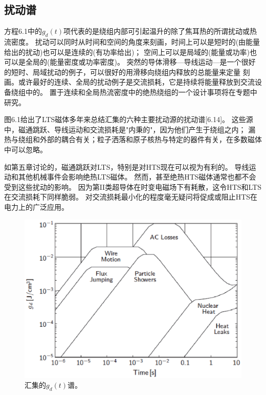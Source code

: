 \subsection{扰动谱}
方程6.1中的$g_d(t)$项代表的是绕组内部可引起温升的除了焦耳热的所谓扰动或热流密度。
扰动可以同时从时间和空间的角度来刻画，时间上可以是短时的(由能量给出的扰动)也可以是连续的(有功率给出)；
空间上可以是局域的(能量或功率)也可以是全局的(能量密度或功率密度)。
突然的导体滑移---导线运动---是一个很好的短时、局域扰动的例子，可以很好的用滑移向绕组内释放的总能量来定量
刻画。或许最好的连续、全局的扰动例子是交流损耗，它是持续将能量释放到交流设备绕组中的。
置于连续和全局热流密度中的绝热绕组的一个设计事项将在专题中研究。

图6.1给出了LTS磁体多年来总结汇集的六种主要扰动源的扰动谱[6.14]。
这些源中，磁通跳跃、导线运动和交流损耗是"内秉的"，因为他们产生于绕组之内；
漏热与绕组和外部的耦合有关；粒子洒落和原子核热与特定的器件有关，在多数磁体中可以忽略。

如第五章讨论的，磁通跳跃对LTS，特别是对HTS现在可以视为有利的。
导线运动和其他机械事件会影响绝热LTS磁体。
然而，甚至绝热HTS磁体通常也都不会受到这些扰动的影响。
因为第II类超导体在时变电磁场下有耗散，这令HTS和LTS在交流损耗下同样脆弱。
对交流损耗最小化的程度毫无疑问将促成或阻止HTS在电力上的广泛应用。

\begin{figure}[htbp]
	\centering
	\includegraphics[scale=0.7]{chpt6/figs/fig6.1.eps}
	\caption{汇集的$g_d(t)$谱。}
\end{figure}

